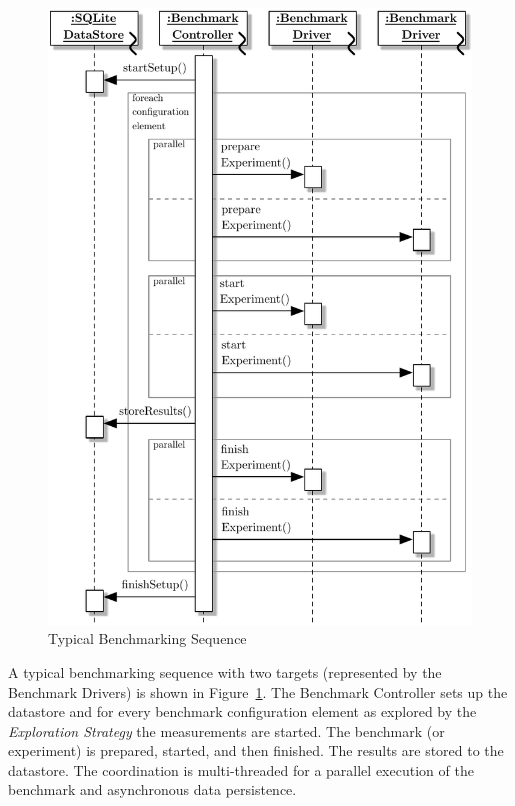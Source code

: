 \begin{figure}[htbp]
    \centering
    \includegraphics[scale=0.55]{graphics/BenchmarkSequence.pdf}
    \caption{Typical Benchmarking Sequence}
    \label{fig:BenchmarkingSequence}
\end{figure}

A typical benchmarking sequence with two targets (represented by the Benchmark Drivers) is shown in Figure~\ref{fig:BenchmarkingSequence}. The Benchmark Controller sets up the datastore and for every benchmark configuration element as explored by the \textit{Exploration Strategy} the measurements are started. The benchmark (or experiment) is prepared, started, and then finished. The results are stored to the datastore. The coordination is multi-threaded for a parallel execution of the benchmark and asynchronous data persistence.

